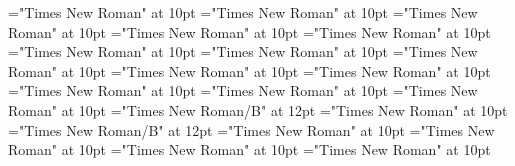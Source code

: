 \documentclass[gps1,twoside]{article}
\begin{document}
\font\variantentrytypesvariantformentrybackrefvariantformentrybackrefsminorentryvariantafter="Times New Roman" at 10pt
\font\spanspanreverseabbrvariantentrytypevariantentrytypesvariantformentrybackrefvariantformentrybackrefsminorentryvariantbefore="Times New Roman" at 10pt
\font\spanreverseabbrvariantentrytypevariantentrytypesvariantformentrybackrefvariantformentrybackrefsminorentryvariantlastchildafter="Times New Roman" at 10pt
\font\spanspanheadwordvariantformentrybackrefvariantformentrybackrefsminorentryvariantbefore="Times New Roman" at 10pt
\font\spanspanowningentrysummarydefinitionvariantformentrybackrefvariantformentrybackrefsminorentryvariantbefore="Times New Roman" at 10pt
\font\spanowningentrysummarydefinitionvariantformentrybackrefvariantformentrybackrefsminorentryvariantlastchildafter="Times New Roman" at 10pt
\font\spanspanvisiblevariantentryrefsminorentryvariantbefore="Times New Roman" at 10pt
\font\visiblevariantentryrefsminorentryvariantafter="Times New Roman" at 10pt
\font\variantentrytypevariantentrytypevariantentrytypesvisiblevariantentryrefvisiblevariantentryrefsminorentryvariantbefore="Times New Roman" at 10pt
\font\variantentrytypesvisiblevariantentryrefvisiblevariantentryrefsminorentryvariantafter="Times New Roman" at 10pt
\font\spanspanabbreviationvariantentrytypevariantentrytypesvisiblevariantentryrefvisiblevariantentryrefsminorentryvariantbefore="Times New Roman" at 10pt
\font\spanabbreviationvariantentrytypevariantentrytypesvisiblevariantentryrefvisiblevariantentryrefsminorentryvariantlastchildafter="Times New Roman" at 10pt
\font{}="Times New Roman" at 10pt
\font\spanbzhheadwordreferencedentryreferencedentriesvisiblevariantentryrefvisiblevariantentryrefsminorentryvariant="Times New Roman/B" at 12pt
\font\spanspanheadwordreferencedentryreferencedentriesvisiblevariantentryrefvisiblevariantentryrefsminorentryvariantbefore="Times New Roman" at 10pt
\font\spanheadwordreferencedentryreferencedentriesvisiblevariantentryrefvisiblevariantentryrefsminorentryvariant="Times New Roman/B" at 12pt
\font\spanspandefinitionorglossreferencedentryreferencedentriesvisiblevariantentryrefvisiblevariantentryrefsminorentryvariantbefore="Times New Roman" at 10pt
\font\spandefinitionorglossreferencedentryreferencedentriesvisiblevariantentryrefvisiblevariantentryrefsminorentryvariantfirstchildbefore="Times New Roman" at 10pt
\font\spanspansummaryvisiblevariantentryrefvisiblevariantentryrefsminorentryvariantbefore="Times New Roman" at 10pt
\font\spansummaryvisiblevariantentryrefvisiblevariantentryrefsminorentryvariantfirstchildbefore="Times New Roman" at 10pt
\end{document}
